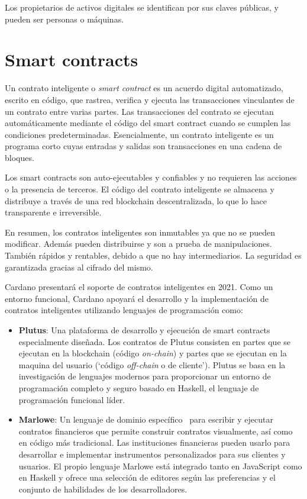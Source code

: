 \documentclass[12pt]{book}
\begin{document}
Los propietarios de activos digitales se identifican por sus claves públicas, y pueden ser personas o máquinas.

\section{Smart contracts}

Un contrato inteligente o \textit{smart contract} es un acuerdo digital automatizado, escrito en código, que rastrea, verifica y ejecuta las transacciones vinculantes de un contrato entre varias partes. Las transacciones del contrato se ejecutan automáticamente mediante el código del smart contract cuando se cumplen las condiciones predeterminadas. Esencialmente, un contrato inteligente es un programa corto cuyas entradas y salidas son transacciones en una cadena de bloques.

Los smart contracts son auto-ejecutables y confiables y no requieren las acciones o la presencia de terceros. El código del contrato inteligente se almacena y distribuye a través de una red blockchain descentralizada, lo que lo hace transparente e irreversible.

En resumen, los contratos inteligentes son inmutables ya que no se pueden modificar. Además pueden distribuirse y son a prueba de manipulaciones. También rápidos y rentables, debido a que no hay intermediarios. La seguridad es garantizada gracias al cifrado del mismo.

Cardano presentará el soporte de contratos inteligentes en 2021. Como un entorno funcional, Cardano apoyará el desarrollo y la implementación de contratos inteligentes utilizando lenguajes de programación como:

\begin{itemize}
	\item \textbf{Plutus}: Una plataforma de desarrollo y ejecución de smart contracts especialmente diseñada.
	      Los contratos de Plutus consisten en partes que se ejecutan en la blockchain (código \textit{on-chain}) y partes que se ejecutan en la maquina del usuario (`código \textit{off-chain} o de cliente').
	      Plutus se basa en la investigación de lenguajes modernos para proporcionar un entorno de programación completo y seguro basado en Haskell, el lenguaje de programación funcional líder.

	\item \textbf{Marlowe}: Un lenguaje de dominio específico~\cite{fowler2010dsl} para escribir y ejecutar contratos financieros que permite construir contratos visualmente, así como en código más tradicional. Las instituciones financieras pueden usarlo para desarrollar e implementar instrumentos personalizados para sus clientes y usuarios. El propio lenguaje Marlowe está integrado tanto en JavaScript como en Haskell y ofrece una selección de editores según las preferencias y el conjunto de habilidades de los desarrolladores.
\end{itemize}
\end{document}
